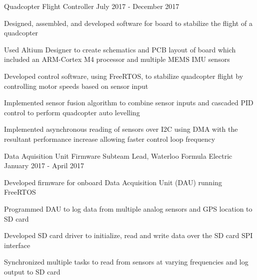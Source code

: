 

\begin{cventries}

  \cventry
    {Quadcopter Flight Controller} %
    {} %
    {} %
    {July 2017 - December 2017} %
    {
      \begin{cvitems} %
        \item {Designed, assembled, and developed software for board to stabilize the flight of a quadcopter}
        \item {Used Altium Designer to create schematics and PCB layout of board which included an ARM-Cortex M4 processor and multiple MEMS IMU sensors}
        \item {Developed control software, using FreeRTOS, to stabilize quadcopter flight by controlling motor speeds based on sensor input}
        \item {Implemented sensor fusion algorithm to combine sensor inputs and cascaded PID control to perform quadcopter auto levelling}
        \item {Implemented asynchronous reading of sensors over I2C using DMA with the resultant performance increase allowing faster control loop frequency}
      \end{cvitems}
    }

  \cventry
    {Data Aquisition Unit} %
    {Firmware Subteam Lead, Waterloo Formula Electric} %
    {} %
    {January 2017 - April 2017} %
    {
      \begin{cvitems} %
        \item {Developed firmware for onboard Data Acquisition Unit (DAU) running FreeRTOS}
        \item {Programmed DAU to log data from multiple analog sensors and GPS location to SD card}
        \item {Developed SD card driver to initialize, read and write data over the SD card SPI interface}
        \item {Synchronized multiple tasks to read from sensors at varying frequencies and log output to SD card}
      \end{cvitems}
    }


\end{cventries}
